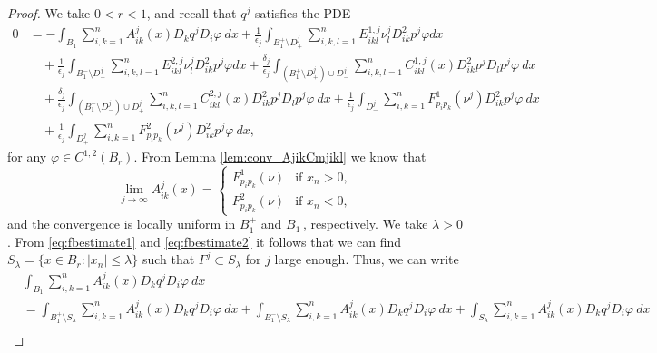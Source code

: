 \documentclass[10pt,a4paper]{amsart}
\begin{document}
\begin{proof}
We take $0<r<1$, and recall that $q^j$ satisfies the PDE
\begin{align}
    0  &= -\int_{B_1}  \sum_{i, k = 1}^n  A^j_{ik}(x) D_k q^j D_i \varphi \ dx +\frac{1}{\epsilon_j}  \int_{B_1^+ \setminus D^j_+}  \sum_{i, k,l = 1}^n E^{1,j}_{ikl} \nu^j_l  D^2_{ik}p^j \varphi dx \nonumber\\
    &\quad +\frac{1}{\epsilon_j}   \int_{B_1^- \setminus D^j_-}  \sum_{i, k,l = 1}^n E^{2,j}_{ikl} \nu^j_l  D^2_{ik}p^j \varphi dx +\frac{\delta_j}{\epsilon_j} \int_{(B^+_1 \setminus D^j_+) \cup D^j_-} \sum_{i, k, l = 1}^n  C^{1,j}_{ikl}(x) D^2_{ik} p^j D_l p^j \varphi \ dx \nonumber \\
    &\quad + \frac{\delta_j}{\epsilon_j} \int_{(B^-_1 \setminus D^j_-) \cup D^j_+ } \sum_{i, k, l = 1}^n  C^{2,j}_{ikl}(x) D^2_{ik} p^j D_l p^j \varphi \ dx + \frac{1}{\epsilon_j} \int_{D^j_-}  \sum_{i, k = 1}^n   F^1_{p_i p_k}(\nu^j) D^2_{ik} p^j \varphi \ dx \nonumber \\
    &\quad + \frac{1}{\epsilon_j} \int_{D^j_+}  \sum_{i, k = 1}^n   F^2_{p_i p_k}(\nu^j) D^2_{ik} p^j \varphi \ dx, \label{eq:pdeforqj} 
\end{align}
for any $\varphi \in C^{1,2}(B_r) $. From Lemma \ref{lem:conv_AjikCmjikl} we know that 
\begin{equation}
\label{eq:Acoeffconv2}
\lim_{j\to \infty} A^j_{ik}(x) =\left\{\begin{array}{ll}
                                        F^1_{p_ip_k}(\nu) & \textrm{if }x_n > 0, \\
                                        F^2_{p_ip_k}(\nu) & \textrm{if }x_n< 0,
                                       \end{array}
\right.
\end{equation}
and the convergence is locally uniform in $B_1^+$ and $B_1^-$, respectively. We take $\lambda>0$. From \eqref{eq:fbestimate1} and \eqref{eq:fbestimate2} it follows that we can find $S_{\lambda}= \{x \in B_r: |x_n|\leq \lambda \}$ such that $\Gamma^j \subset S_\lambda$ for $j$ large enough. Thus, we can write 
\begin{align*}
&\int_{B_1}  \sum_{i, k = 1}^n  A^j_{ik}(x) D_k q^j D_i \varphi \ dx \\
     &= \int_{B_1^+\setminus S_{\lambda}}  \sum_{i, k = 1}^n  A^j_{ik}(x) D_k q^j D_i \varphi \ dx 
     + \int_{B_1^-\setminus S_{\lambda}}  \sum_{i, k = 1}^n  A^j_{ik}(x) D_k q^j D_i \varphi \ dx 
     + \int_{S_{\lambda}}  \sum_{i, k = 1}^n  A^j_{ik}(x) D_k q^j D_i \varphi \ dx \\

\end{align*}
\end{proof}
\end{document}
